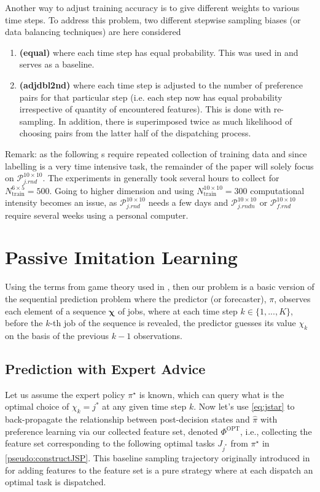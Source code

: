 \documentclass[twocolumn]{svjour3}
\newcommand{\vchi}{\bm \chi}
\newcommand{\Problem}[2][ ]{$\mathcal{P}_{#2}^{#1}$}
\newcommand{\jrnd}[2]{\Problem[#1 \times #2]{j.rnd}}
\newcommand{\jrndn}[2]{\Problem[#1 \times #2]{j.rndn}}
\newcommand{\frnd}[2]{\Problem[#1 \times #2]{f.rnd}}
\begin{document}
Another way to adjust training accuracy is to give different weights to various 
time steps. To address this problem, two different stepwise sampling biases (or 
data balancing techniques) are here considered
\begin{enumerate}[after={{}}, leftmargin=*,
label={\textbf{Bias.\arabic*}}, ref={{Bias.\arabic*}}]
\item \label{bias:equal} \textbf{(equal)} where each time step has equal 
probability. This was used in \cite{InRu14,InRu15a} and serves as a baseline.
\item \label{bias:adjdbl2nd} \textbf{(adjdbl2nd)} where each time step is 
adjusted to the number of preference pairs for that particular step (i.e. 
each step now has equal probability irrespective of quantity of encountered 
features). This is done with re-sampling.
In addition, there is superimposed twice as much likelihood of 
choosing pairs from the latter half of the dispatching process. 
\end{enumerate}

\noindent Remark: as the following s require 
repeated collection of training data and since labelling is a very 
time intensive task, the remainder of the paper will solely focus 
on \jrnd{10}{10}.
The experiments in \cite{InRu15a} generally took several hours to collect for 
$N_{\text{train}}^{6\times5}=500$. 
Going to higher dimension and using $N_{\text{train}}^{10\times10}=300$ 
computational intensity becomes an issue, as \jrnd{10}{10} needs a few days and 
\jrndn{10}{10} or \frnd{10}{10} require several weeks using a personal computer.

\section{Passive Imitation Learning}\label{sec:il:passive}
Using the terms from game theory used in \cite{CesaBianchi06}, %
then our problem is a basic version of the sequential prediction problem where 
the predictor (or forecaster), $\pi$, observes each element of a sequence 
$\vchi$ of jobs, where at each time step $k \in \{1,...,K\}$, before the 
$k$-th job of the sequence is revealed, the predictor guesses its value 
$\chi_k$ on the basis of the previous $k-1$ observations. 

\subsection{Prediction with Expert Advice}\label{sec:expertPolicy}
Let us assume the expert policy $\pi^\star$ is known, which can query what 
is the optimal choice of $\chi_k={j^*}$ at any given time step $k$. 
Now let's use \cref{eq:jstar} to back-propagate the relationship between 
post-decision states and $\hat{\pi}$ with preference learning via our collected 
feature set, denoted $\Phi^\text{OPT}$, i.e., collecting the feature set 
corresponding to the following optimal tasks $J_{j^*}$ from $\pi^\star$ in 
\cref{pseudo:constructJSP}.
This baseline sampling trajectory originally introduced in \cite{InRu11a} for 
adding features to the feature set is a pure strategy where at each dispatch an 
optimal task is dispatched.
\end{document}
